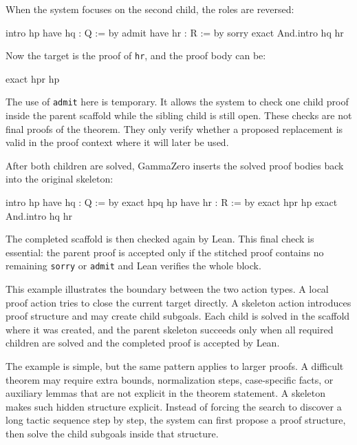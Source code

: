When the system focuses on the second child, the roles are reversed:
\begin{leanblock}
intro hp
have hq : Q := by
  admit
have hr : R := by
  sorry
exact And.intro hq hr
\end{leanblock}

Now the target is the proof of \texttt{hr}, and the proof body can be:
\begin{leanblock}
exact hpr hp
\end{leanblock}

The use of \texttt{admit} here is temporary. It allows the system to check one child proof inside the
parent scaffold while the sibling child is still open. These checks are not final proofs of the theorem.
They only verify whether a proposed replacement is valid in the proof context where it will later be used.

After both children are solved, GammaZero inserts the solved proof bodies back into the original skeleton:
\begin{leanblock}
intro hp
have hq : Q := by
  exact hpq hp
have hr : R := by
  exact hpr hp
exact And.intro hq hr
\end{leanblock}

The completed scaffold is then checked again by Lean. This final check is essential: the parent proof is
accepted only if the stitched proof contains no remaining \texttt{sorry} or \texttt{admit} and Lean verifies
the whole block.

This example illustrates the boundary between the two action types. A local proof action tries to close
the current target directly. A skeleton action introduces proof structure and may create
child subgoals. Each child is solved in the scaffold where it was created, and the parent skeleton succeeds
only when all required children are solved and the completed proof is accepted by Lean.

The example is simple, but the same pattern applies to larger proofs. A difficult theorem may require
extra bounds, normalization steps, case-specific facts, or auxiliary lemmas that are not explicit in
the theorem statement. A skeleton makes such hidden structure explicit. Instead of forcing the search to
discover a long tactic sequence step by step, the system can first propose a proof structure, then solve the
child subgoals inside that structure.

